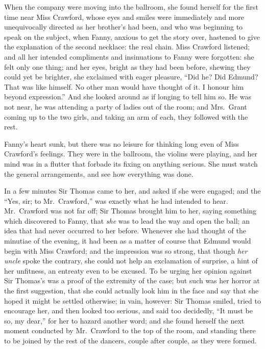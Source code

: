 \documentclass{article}
\begin{document}
When the company were moving into the ballroom, she found
herself for the first time near Miss Crawford, whose eyes
and smiles were immediately and more unequivocally directed
as her brother's had been, and who was beginning to speak
on the subject, when Fanny, anxious to get the story over,
hastened to give the explanation of the second necklace:
the real chain.  Miss Crawford listened; and all her intended
compliments and insinuations to Fanny were forgotten:
she felt only one thing; and her eyes, bright as they
had been before, shewing they could yet be brighter,
she exclaimed with eager pleasure, ``Did he?  Did Edmund?
That was like himself.  No other man would have thought of it.
I honour him beyond expression.''  And she looked around
as if longing to tell him so.  He was not near, he was
attending a party of ladies out of the room; and Mrs.\ Grant
coming up to the two girls, and taking an arm of each,
they followed with the rest.

Fanny's heart sunk, but there was no leisure for
thinking long even of Miss Crawford's feelings.
They were in the ballroom, the violins were playing,
and her mind was in a flutter that forbade its fixing on
anything serious.  She must watch the general arrangements,
and see how everything was done.

In a few minutes Sir Thomas came to her, and asked if
she were engaged; and the ``Yes, sir; to Mr.\ Crawford,''
was exactly what he had intended to hear.  Mr.\ Crawford
was not far off; Sir Thomas brought him to her,
saying something which discovered to Fanny, that \emph{she}
was to lead the way and open the ball; an idea that had
never occurred to her before.  Whenever she had thought
of the minutiae of the evening, it had been as a matter
of course that Edmund would begin with Miss Crawford;
and the impression was so strong, that though \emph{her} \emph{uncle}
spoke the contrary, she could not help an exclamation
of surprise, a hint of her unfitness, an entreaty even to
be excused.  To be urging her opinion against Sir Thomas's
was a proof of the extremity of the case; but such was her
horror at the first suggestion, that she could actually
look him in the face and say that she hoped it might be
settled otherwise; in vain, however:  Sir Thomas smiled,
tried to encourage her, and then looked too serious,
and said too decidedly, ``It must be so, my dear,'' for her
to hazard another word; and she found herself the next
moment conducted by Mr.\ Crawford to the top of the room,
and standing there to be joined by the rest of the dancers,
couple after couple, as they were formed.
\end{document}
